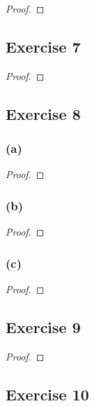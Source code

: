 \documentclass[14pt]{extarticle}
\begin{document}
\begin{proof}

\end{proof}

\subsection{Exercise 7}

\begin{proof}

\end{proof}

\subsection{Exercise 8}

\subsubsection{(a)}

\begin{proof}

\end{proof}

\subsubsection{(b)}

\begin{proof}

\end{proof}

\subsubsection{(c)}

\begin{proof}

\end{proof}

\subsection{Exercise 9}

\begin{proof}

\end{proof}

\subsection{Exercise 10}
\end{document}
